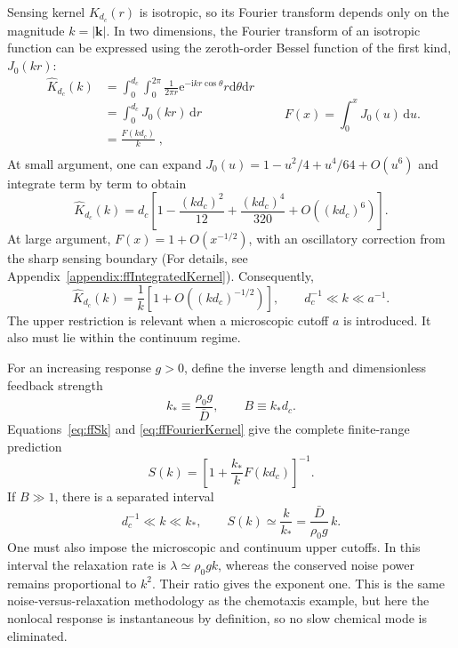 \documentclass{article}
\begin{document}
Sensing kernel $ K_{d_c}(r) $ is isotropic, so its Fourier transform depends only on the magnitude $k=|\mathbf k|$. In two dimensions, the Fourier transform of an isotropic function can be expressed using the zeroth-order Bessel function of the first kind, $J_0(kr)$:
\begin{equation}
    \begin{aligned}
        \widehat{K}_{d_c}(k)&=\int_0^{d_c}{\int_0^{2\pi}{\frac{1}{2\pi r}\mathrm{e}^{-\mathrm{i}kr\cos \theta}r\mathrm{d}\theta \mathrm{d}r}}\\
        &=\int_0^{d_c}{J_0(kr)\,\mathrm{d}r}\\
        &=\frac{F(kd_c)}{k}\;,\\
    \end{aligned}
    \qquad 
    F(x)=\int_0^xJ_0(u)\,\mathrm du.
    \label{eq:ffFourierKernel}
\end{equation}
At small argument, one can expand $J_0(u)=1-u^2/4+u^4/64+O(u^6)$ and integrate term by term to obtain
\begin{equation}
    \widehat K_{d_c}(k)
    =d_c\left[1-\frac{(kd_c)^2}{12}+\frac{(kd_c)^4}{320}
    +O((kd_c)^6)\right].
    \label{eq:ffKernelSmall}
\end{equation}
At large argument, $F(x)=1+O(x^{-1/2})$, with an oscillatory correction from the sharp sensing boundary (For details, see Appendix~\ref{appendix:ffIntegratedKernel}). Consequently,
\begin{equation}
    \widehat K_{d_c}(k)=\frac1k[1+O((kd_c)^{-1/2})],
    \qquad d_c^{-1}\ll k\ll a^{-1}.
    \label{eq:ffKernelIntermediate}
\end{equation}
The upper restriction is relevant when a microscopic cutoff $a$ is introduced. It also must lie within the continuum regime.

For an increasing response $g>0$, define the inverse length and dimensionless feedback strength
\begin{equation}
    k_*\equiv\frac{\rho_0g}{\bar D},\qquad B\equiv k_*d_c.
\end{equation}
Equations~\eqref{eq:ffSk} and \eqref{eq:ffFourierKernel} give the complete finite-range prediction
\begin{equation}
    \boxed{S(k)=\left[1+\frac{k_*}{k}F(kd_c)\right]^{-1}.}
    \label{eq:ffFiniteRangeSk}
\end{equation}
If $B\gg1$, there is a separated interval
\begin{equation}
    \boxed{d_c^{-1}\ll k\ll k_*,\qquad
    S(k)\simeq\frac{k}{k_*}=\frac{\bar D}{\rho_0g}\,k.}
    \label{eq:ffLinearScaling}
\end{equation}
One must also impose the microscopic and continuum upper cutoffs. In this interval the relaxation rate is $\lambda\simeq\rho_0gk$, whereas the conserved noise power remains proportional to $k^2$. Their ratio gives the exponent one. This is the same noise-versus-relaxation methodology as the chemotaxis example, but here the nonlocal response is instantaneous by definition, so no slow chemical mode is eliminated.
\end{document}

